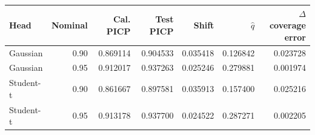 \begin{tabular}{@{}lrrrrrr@{}}
\toprule
Head & Nominal & Cal. PICP & Test PICP & Shift & $\hat q$ & $\Delta$ coverage error \\
\midrule
Gaussian & 0.90 & 0.869114 & 0.904533 & 0.035418 & 0.126842 & 0.023728 \\
Gaussian & 0.95 & 0.912017 & 0.937263 & 0.025246 & 0.279881 & 0.001974 \\
Student-t & 0.90 & 0.861667 & 0.897581 & 0.035913 & 0.157400 & 0.025216 \\
Student-t & 0.95 & 0.913178 & 0.937700 & 0.024522 & 0.287271 & 0.002205 \\
\bottomrule
\end{tabular}
